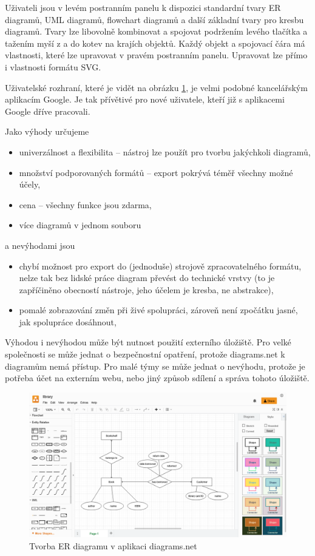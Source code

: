 Uživateli jsou v levém postranním panelu k dispozici standardní tvary ER
diagramů, UML diagramů, flowchart diagramů a další základní tvary pro kresbu
diagramů. Tvary lze libovolně kombinovat a spojovat podržením levého tlačítka a
tažením myší z a do kotev na krajích objektů. Každý objekt a spojovací čára má
vlastnosti, které lze upravovat v pravém postranním panelu. Upravovat lze přímo
i vlastnosti formátu SVG.

Uživatelské rozhraní, které je vidět na obrázku \ref{fig:diagrams.net}, je velmi
podobné kancelářským aplikacím Google. Je tak přívětivé pro nové uživatele,
kteří již s aplikacemi Google dříve pracovali.

Jako výhody určujeme
\begin{itemize}
  \item univerzálnost a flexibilita -- nástroj lze použít pro tvorbu jakýchkoli
  diagramů,
  \item množství podporovaných formátů -- export pokrývá téměř všechny možné
  účely,
  \item cena -- všechny funkce jsou zdarma,
  \item více diagramů v jednom souboru
\end{itemize}
a nevýhodami jsou
\begin{itemize}
  \item chybí možnost pro export do (jednoduše) strojově zpracovatelného
  formátu, nelze tak bez lidské práce diagram převést do technické vrstvy (to je
  zapříčiněno obecností nástroje, jeho účelem je kresba, ne abstrakce),
  \item pomalé zobrazování změn při živé spolupráci, zároveň není zpočátku
  jasné, jak spolupráce dosáhnout,
\end{itemize}

Výhodou i nevýhodou může být nutnost použití externího úložiště. Pro velké
společnosti se může jednat o bezpečnostní opatření, protože diagrams.net k
diagramům nemá přístup. Pro malé týmy se může jednat o nevýhodu, protože je
potřeba účet na externím webu, nebo jiný způsob sdílení a správa tohoto
úložiště.

\begin{figure}
  \centering
  \includegraphics[width=\textwidth]{../img/diagrams.net.png}
  \caption{Tvorba ER diagramu v aplikaci diagrams.net}
  \label{fig:diagrams.net}
\end{figure}

